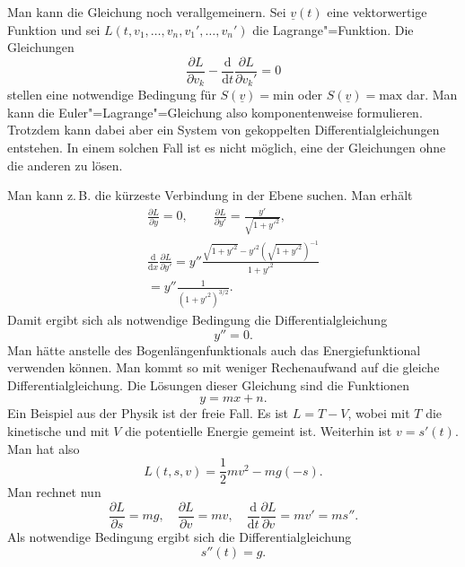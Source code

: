 \documentclass[a4paper,11pt,fleqn,twocolumn,twoside]{scrartcl}
\numberwithin{equation}{section}
\begin{document}
Man kann die Gleichung noch verallgemeinern. Sei $\underline v(t)$
eine vektorwertige Funktion und sei
$L(t,v_1,\ldots,v_n,v_1',\ldots,v_n')$ die Lagrange"=Funktion.
Die Gleichungen
\begin{equation}
\frac{\partial L}{\partial v_k}
-\frac{\mathrm d}{\mathrm dt}\frac{\partial L}{\partial v_k'}
=0
\end{equation}
stellen eine notwendige Bedingung für
$S(\underline v)=\mathrm{min}$ oder
$S(\underline v)=\mathrm{max}$ dar.
Man kann die Euler"=Lagrange"=Gleichung also komponentenweise
formulieren. Trotzdem kann dabei aber ein System von gekoppelten
Differentialgleichungen entstehen. In einem solchen Fall ist es
nicht möglich, eine der Gleichungen ohne die anderen zu lösen.

Man kann z.\,B. die kürzeste Verbindung in der Ebene suchen. Man erhält
\begin{gather*}
\frac{\partial L}{\partial y} = 0,\qquad
\frac{\partial L}{\partial y'} = \frac{y'}{\sqrt{1+y'^2}},\\
\frac{\mathrm d}{\mathrm dx}\frac{\partial L}{\partial y'}
= y''\frac{\sqrt{1+y'^2}-y'^2(\sqrt{1+y'^2})^{-1}}{1+y'^2}\\
= y''\frac{1}{(1+y'^2)^{3/2}}.
\end{gather*}
Damit ergibt sich als notwendige Bedingung die Differentialgleichung
\begin{equation}
y''=0.
\end{equation}
Man hätte anstelle des Bogenlängenfunktionals auch das
Energiefunktional verwenden können. Man kommt so mit weniger
Rechenaufwand auf die gleiche Differentialgleichung.
Die Lösungen dieser Gleichung sind die Funktionen
\begin{equation}
y=mx+n.
\end{equation}
Ein Beispiel aus der Physik ist der freie Fall. Es ist $L=T-V$,
wobei mit $T$ die kinetische und mit $V$ die potentielle Energie
gemeint ist. Weiterhin ist $v=s'(t)$. Man hat also
\begin{equation}
L(t,s,v) = \frac{1}{2}mv^2 - mg(-s).
\end{equation}
Man rechnet nun
\begin{equation}
\frac{\partial L}{\partial s} = mg,\quad
\frac{\partial L}{\partial v} = mv,\quad
\frac{\mathrm d}{\mathrm dt}\frac{\partial L}{\partial v}
= mv' = ms''.
\end{equation}
Als notwendige Bedingung ergibt sich die Differentialgleichung
\begin{equation}
s''(t) = g.
\end{equation}
\end{document}
